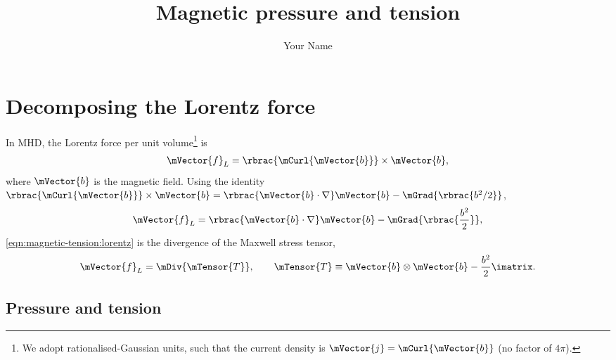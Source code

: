\documentclass{article}
\title{Magnetic pressure and tension}
\author{Your Name}
\date{}
\begin{document}
\maketitle

\section{Decomposing the Lorentz force}
\label{sec:magnetic-tension}

In MHD, the Lorentz force per unit volume\footnote{
    We adopt rationalised-Gaussian units, such that the current density is $\mVector{j} = \mCurl{\mVector{b}}$ (\ie no factor of $4\pi$).
} is
\begin{align}
    \mVector{f}_L = \rbrac{\mCurl{\mVector{b}}}\times\mVector{b}
    , \label{eqn:magnetic-tension:lorentz}
\end{align}
where $\mVector{b}$ is the magnetic field. Using the identity $\rbrac{\mCurl{\mVector{b}}}\times\mVector{b} = \rbrac{\mVector{b}\cdot\nabla}\mVector{b} - \mGrad{\rbrac{b^2/2}}$,
\begin{align*}
    \mVector{f}_L
    = \rbrac{\mVector{b}\cdot\nabla}\mVector{b}
        - \mGrad{\rbrac{\frac{b^2}{2}}} ,
\end{align*}
\ie \cref{eqn:magnetic-tension:lorentz} is the divergence of the Maxwell stress tensor,
\begin{align}
    \mVector{f}_L = \mDiv{\mTensor{T}} ,
    \qquad
    \mTensor{T} \equiv \mVector{b}\otimes\mVector{b} - \frac{b^2}{2} \imatrix
    . \label{eqn:magnetic-tension:stress}
\end{align}

\subsection{Pressure and tension}
\label{sec:magnetic-tension:decomposition}
\end{document}
